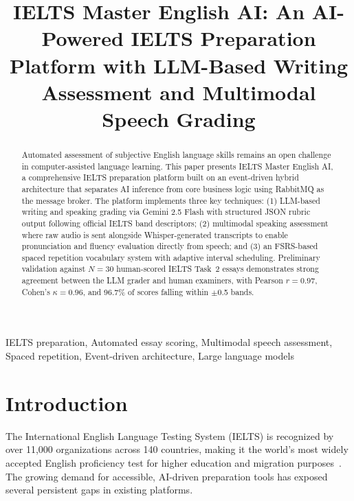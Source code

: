 \documentclass[conference]{IEEEtran}
\begin{document}
\title{IELTS Master English AI: An AI-Powered IELTS Preparation Platform with LLM-Based Writing Assessment and Multimodal Speech Grading}

\author{
}

\maketitle

\begin{abstract}
Automated assessment of subjective English language skills remains an open challenge in computer-assisted language learning. This paper presents IELTS Master English AI, a comprehensive IELTS preparation platform built on an event-driven hybrid architecture that separates AI inference from core business logic using RabbitMQ as the message broker. The platform implements three key techniques: (1) LLM-based writing and speaking grading via Gemini 2.5 Flash with structured JSON rubric output following official IELTS band descriptors; (2) multimodal speaking assessment where raw audio is sent alongside Whisper-generated transcripts to enable pronunciation and fluency evaluation directly from speech; and (3) an FSRS-based spaced repetition vocabulary system with adaptive interval scheduling. Preliminary validation against $N=30$ human-scored IELTS Task~2 essays demonstrates strong agreement between the LLM grader and human examiners, with Pearson $r=0.97$, Cohen's $\kappa=0.96$, and 96.7\% of scores falling within $\pm$0.5 bands.
\end{abstract}

\begin{IEEEkeywords}
IELTS preparation, Automated essay scoring, Multimodal speech assessment, Spaced repetition, Event-driven architecture, Large language models
\end{IEEEkeywords}

\section{Introduction}

The International English Language Testing System (IELTS) is recognized by over 11,000 organizations across 140 countries, making it the world's most widely accepted English proficiency test for higher education and migration purposes~\cite{ielts_stats}. The growing demand for accessible, AI-driven preparation tools has exposed several persistent gaps in existing platforms.
\end{document}
